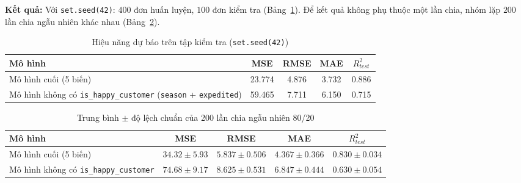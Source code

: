 \textbf{Kết quả:} Với \texttt{set.seed(42)}: $400$ đơn huấn luyện, $100$ đơn kiểm tra (Bảng~\ref{tab:tt42}). Để kết quả không phụ thuộc một lần chia, nhóm lặp $200$ lần chia ngẫu nhiên khác nhau (Bảng~\ref{tab:tt200}).
\begin{table}[H]
    \centering
    \small\setlength{\tabcolsep}{3pt}
    \begin{tabular}{|p{4.6cm}|c|c|c|c|}
    \hline
    \textbf{Mô hình} & \textbf{MSE} & \textbf{RMSE} & \textbf{MAE} & $R^2_{test}$ \\ \hline
    Mô hình cuối (5 biến) & 23.774 & 4.876 & 3.732 & 0.886 \\ \hline
    Mô hình không có \texttt{is\_happy\_customer} (\texttt{season} + \texttt{expedited}) & 59.465 & 7.711 & 6.150 & 0.715 \\ \hline
    \end{tabular}
    \caption{Hiệu năng dự báo trên tập kiểm tra (\texttt{set.seed(42)})}
    \label{tab:tt42}
\end{table}
\begin{table}[H]
    \centering
    \small\setlength{\tabcolsep}{3pt}
    \begin{tabular}{|p{4.6cm}|c|c|c|c|}
    \hline
    \textbf{Mô hình} & \textbf{MSE} & \textbf{RMSE} & \textbf{MAE} & $R^2_{test}$ \\ \hline
    Mô hình cuối (5 biến) & $34.32 \pm 5.93$ & $5.837 \pm 0.506$ & $4.367 \pm 0.366$ & $0.830 \pm 0.034$ \\ \hline
    Mô hình không có \texttt{is\_happy\_customer} & $74.68 \pm 9.17$ & $8.625 \pm 0.531$ & $6.847 \pm 0.444$ & $0.630 \pm 0.054$ \\ \hline
    \end{tabular}
    \caption{Trung bình $\pm$ độ lệch chuẩn của 200 lần chia ngẫu nhiên 80/20}
    \label{tab:tt200}
\end{table}

